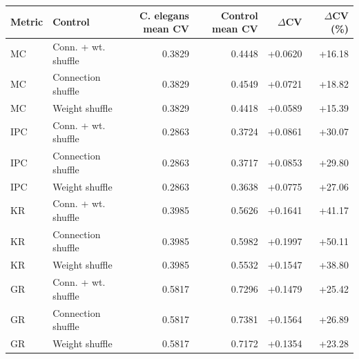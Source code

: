 \begin{tabular}{llrrrr}
\toprule
Metric & Control & C. elegans mean CV & Control mean CV & $\Delta$CV & $\Delta$CV (\%) \\
\midrule
MC & Conn. + wt. shuffle & 0.3829 & 0.4448 & +0.0620 & +16.18 \\
MC & Connection shuffle & 0.3829 & 0.4549 & +0.0721 & +18.82 \\
MC & Weight shuffle & 0.3829 & 0.4418 & +0.0589 & +15.39 \\
IPC & Conn. + wt. shuffle & 0.2863 & 0.3724 & +0.0861 & +30.07 \\
IPC & Connection shuffle & 0.2863 & 0.3717 & +0.0853 & +29.80 \\
IPC & Weight shuffle & 0.2863 & 0.3638 & +0.0775 & +27.06 \\
KR & Conn. + wt. shuffle & 0.3985 & 0.5626 & +0.1641 & +41.17 \\
KR & Connection shuffle & 0.3985 & 0.5982 & +0.1997 & +50.11 \\
KR & Weight shuffle & 0.3985 & 0.5532 & +0.1547 & +38.80 \\
GR & Conn. + wt. shuffle & 0.5817 & 0.7296 & +0.1479 & +25.42 \\
GR & Connection shuffle & 0.5817 & 0.7381 & +0.1564 & +26.89 \\
GR & Weight shuffle & 0.5817 & 0.7172 & +0.1354 & +23.28 \\
\bottomrule
\end{tabular}
